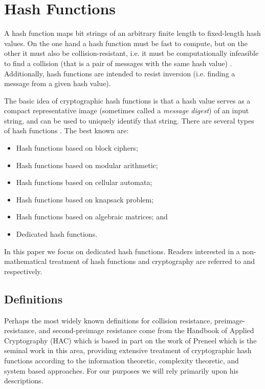 \section{Hash Functions}\label{sec:2}

A hash function maps bit strings of an arbitrary finite length to
fixed-length hash values. On the one hand a hash function must be fast
to compute, but on the other it must also be collision-resistant, i.e.
it must be computationally infeasible to find a collision (that is a
pair of messages with the same hash value) \cite{ref11}.
Additionally, hash functions are intended to resist inversion (i.e.
finding a message from a given hash value).

The basic idea of cryptographic hash functions is that a hash value
serves as a compact representative image (sometimes called a
\emph{message digest}) of an input string, and can be used to uniquely
identify that string. There are several types of hash functions
\cite{ref6}\cite{ref25}. The best known are:

\begin{itemize}
\tightlist
\item
  Hash functions based on block ciphers;
\item
  Hash functions based on modular arithmetic;
\item
  Hash functions based on cellular automata;
\item
  Hash functions based on knapsack problem;
\item
  Hash functions based on algebraic matrices; and
\item
  Dedicated hash functions.
\end{itemize}

In this paper we focus on dedicated hash functions. Readers interested
in a non-mathematical treatment of hash functions and cryptography are
referred to \cite{ref28} and \cite{ref27}
respectively.

\subsection{Definitions}\label{sec:2.1}\label{definitions}

Perhaps the most widely known definitions for collision resistance,
preimage-resistance, and second-preimage resistance come from the
Handbook of Applied Cryptography (HAC) \cite{ref2} which is
based in part on the work of Preneel \cite{ref5} which is the
seminal work in this area, providing extensive treatment of
cryptographic hash functions according to the information theoretic,
complexity theoretic, and system based approaches. For our purposes we
will rely primarily upon his descriptions.

